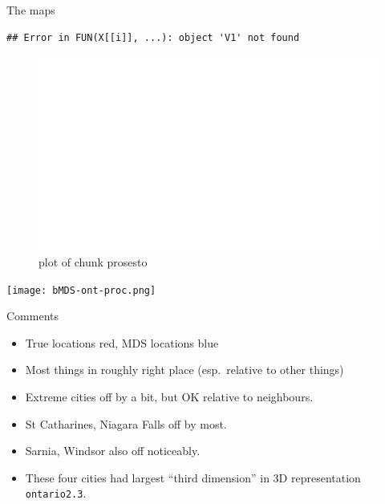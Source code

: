 \documentclass[ignorenonframetext,]{beamer}
\begin{document}
\begin{frame}[fragile]{The maps}
\protect\hypertarget{the-maps}{}

\begin{verbatim}
## Error in FUN(X[[i]], ...): object 'V1' not found
\end{verbatim}

\begin{figure}
\centering
\includegraphics{figure/prosesto-1.pdf}
\caption{plot of chunk prosesto}
\end{figure}

\texttt{[image: bMDS-ont-proc.png]}

\end{frame}

\begin{frame}[fragile]{Comments}
\protect\hypertarget{comments-2}{}

\begin{itemize}
\item
  True locations red, MDS locations blue
\item
  Most things in roughly right place (esp.~relative to other things)
\item
  Extreme cities off by a bit, but OK relative to neighbours.
\item
  St Catharines, Niagara Falls off by most.
\item
  Sarnia, Windsor also off noticeably.
\item
  These four cities had largest ``third dimension'' in 3D representation
  \texttt{ontario2.3}.
\end{itemize}

\end{frame}
\end{document}
